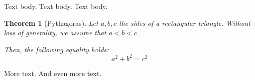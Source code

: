 \documentclass[a4paper]{scrartcl}
\theoremstyle{break}
\newtheorem{theorem}{Theorem}
\begin{document}
Text body. Text body. Text body.

\begin{theorem}[Pythagoras]
    Let $a,b,c$ the sides of a rectangular triangle.
    Without loss of generality, we assume that  $a<b<c$.

    Then, the following equality holds:
           \[a^2 + b^2 = c^2\]
\end{theorem}

More text. And even more text.
\end{document}
